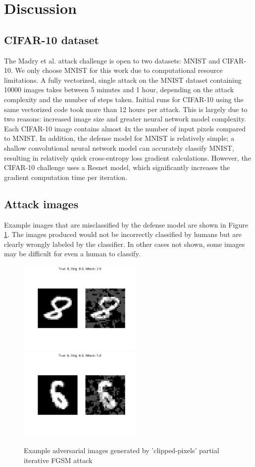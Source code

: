 \section{Discussion}
\subsection{CIFAR-10 dataset}
The Madry et al. attack challenge is open to two datasets: MNIST and CIFAR-10. We only choose MNIST for this work due to computational resource limitations. A fully vectorized, single attack on the MNIST dataset containing 10000 images takes between 5 minutes and 1 hour, depending on the attack complexity and the number of steps taken. Initial runs for CIFAR-10 using the same vectorized code took more than 12 hours per attack. This is largely due to two reasons: increased image size and greater neural network model complexity. Each CIFAR-10 image contains almost 4x the number of input pixels compared to MNIST. In addition, the defense model for MNIST is relatively simple; a shallow convolutional neural network model can accurately classify MNIST, resulting in relatively quick cross-entropy loss gradient calculations. However, the CIFAR-10 challenge uses a Resnet model, which significantly increases the gradient computation time per iteration.

\subsection{Attack images}
Example images that are misclassified by the defense model are shown in Figure \ref{fig:adv_example_images}. The images produced would not be incorrectly classified by humans but are clearly wrongly labeled by the classifier. In other cases not shown, some images may be difficult for even a human to classify.

\begin{figure}
    \centering
    \includegraphics[width=6cm]{Report/sections/images/sample_61.png}
    \qquad
    \includegraphics[width=6cm]{Report/sections/images/sample_1182.png}
    \caption{Example adversarial images generated by 'clipped-pixels' partial iterative FGSM attack}
    \label{fig:adv_example_images}
\end{figure}

